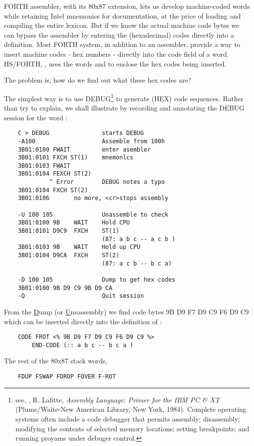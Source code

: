  FORTH assembler, with its 80x87 extension, lets us develop machine-coded words while retaining Intel mnemonics for documentation, at the price of loading and compiling the entire  lexicon. But if we know the actual machine code bytes we can bypass the assembler by entering the (hexadecimal) codes directly into a  definition. Most FORTH system, in addition to an assembler, provide a way to insert machine codes - hex numbers - directly into the code field of a word. HS/FORTH, \eg, uses the words \regc{<\%} and \regc{\%>} to enclose the hex codes being inserted.

The problem is, how do we find out what these hex codes are?

The simplest way is to use DEBUG\footnote{see, \eg, R. Lafitte, \textit{Assembly Language: Primer for the IBM PC \& XT} (Plume/Waite-New American Library, New York, 1984). Complete operating systems often include a code debugger that permits assembly; disassembly; modifying the contents of selected memory locations; setting breakpoints; and running proyams under debuger control.} to generate (HEX) code sequences. Rather than try to explain, we shall illustrate by recording and annotating the DEBUG session for the word :

\begin{lstlisting}
    C > DEBUG               starts DEBUG
    -A100                   Assemble from 100h
    3B01:0100 FWAIT         enter asembler
    3B01:0101 FXCH ST(1)    mnemonlcs
    3B01:0103 FWAIT
    3B01:0104 FEXCH ST(2)
             ^ Error        DEBUG notes a typo
    3B01:0104 FXCH ST(2)
    3B01:0106       no more, <cr>stops assembly
    
    -U 100 105              Unassemble to check
    3B01:0100 9B    WAIT    Hold CPU
    3B01:0101 D9C9  FXCH    ST(1)
                            (87: a b c -- a c b )
    3B01:0103 9B    WAIT    Hold up CPU
    3B01:0104 D9CA  FXCH    ST(2)
                            (87: a c b -- b c a)

    -D 100 105              Dump to get hex codes
    3B01:0100 9B D9 C9 9B D9 CA
    -Q                      Quit session
\end{lstlisting}

From the \underline{D}ump (or \underline{U}nsassembly) we find code bytes 9B D9 F7 D9 C9 F6 D9 C9 which can be inserted directly into the definition of :

\begin{lstlisting}
    CODE FROT <% 9B D9 F7 D9 C9 F6 D9 C9 %>
        END-CODE (:: a b c -- b c a )
\end{lstlisting}
The rest of the 80x87 stack words,
\begin{lstlisting}
    FDUP FSWAP FDROP FOVER F-ROT
\end{lstlisting}

